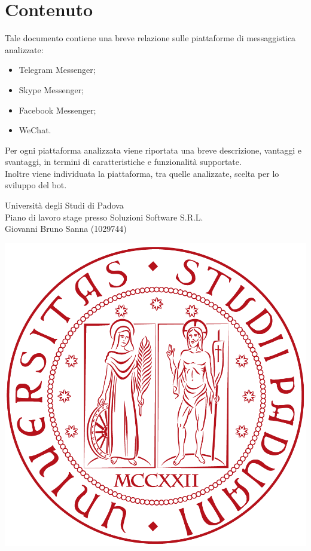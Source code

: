 \documentclass[11pt,notitlepage]{article}
\newcommand{\nomeStudente}{Giovanni Bruno}
\newcommand{\cognomeStudente}{Sanna}
\newcommand{\matricolaStudente}{1029744}
\newcommand{\ragioneSocAzienda}{Soluzioni Software S.R.L.}
\begin{document}
\section*{Contenuto}
Tale documento contiene una breve relazione sulle piattaforme di messaggistica analizzate:
\begin{itemize}
		\item Telegram Messenger; 
		\item Skype Messenger; 
		\item Facebook Messenger;
		\item WeChat.
		
	\end{itemize} 
	Per ogni piattaforma analizzata viene riportata una breve descrizione, vantaggi e svantaggi, in termini di caratteristiche e funzionalità supportate. \\
	Inoltre viene individuata la piattaforma, tra quelle analizzate, scelta per lo sviluppo del bot.


\newpage



\noindent
\parbox{0.7\columnwidth}{Università degli Studi di Padova\\
	Piano di lavoro stage presso \ragioneSocAzienda{}\\
	\nomeStudente{} \cognomeStudente{} (\matricolaStudente{})}%
\parbox{0.3\columnwidth}{
	\hfill \includegraphics[scale=0.08]{immagini/logo-unipd.png}}
\end{document}
